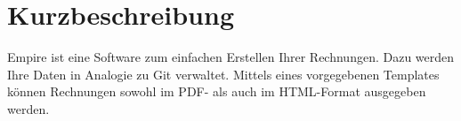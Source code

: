 
\section{Kurzbeschreibung}

Empire ist eine Software zum einfachen Erstellen Ihrer Rechnungen. Dazu werden Ihre Daten in Analogie zu Git verwaltet. Mittels eines vorgegebenen Templates können Rechnungen sowohl im PDF- als auch im HTML-Format ausgegeben werden.
